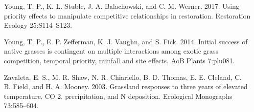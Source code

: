 \documentclass[twoside,12pt,final]{ucthesis-CA2012}
\newlength{\cslhangindent}
\newenvironment{cslreferences}%
  {\setlength{\parindent}{0pt}%
  \everypar{\setlength{\hangindent}{\cslhangindent}}\ignorespaces}%
  {\par}
\begin{document}
\begin{ucmainmatter}
\begin{cslreferences}
\leavevmode\hypertarget{ref-Young2017}{}%
Young, T. P., K. L. Stuble, J. A. Balachowski, and C. M. Werner. 2017. Using priority effects to manipulate competitive relationships in restoration. Restoration Ecology 25:S114--S123.

\leavevmode\hypertarget{ref-Young2014}{}%
Young, T. P., E. P. Zefferman, K. J. Vaughn, and S. Fick. 2014. Initial success of native grasses is contingent on multiple interactions among exotic grass competition, temporal priority, rainfall and site effects. AoB Plants 7:plu081.

\leavevmode\hypertarget{ref-Zavaleta2003}{}%
Zavaleta, E. S., M. R. Shaw, N. R. Chiariello, B. D. Thomas, E. E. Cleland, C. B. Field, and H. A. Mooney. 2003. Grassland responses to three years of elevated temperature, CO 2, precipitation, and N deposition. Ecological Monographs 73:585--604.
\end{cslreferences}
\end{ucmainmatter}
\end{document}
